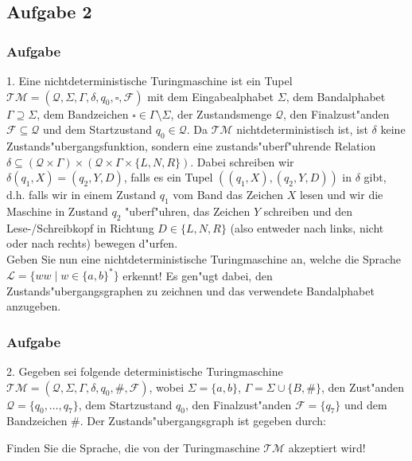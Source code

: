 \subsection{Aufgabe 2}
\begin{frame}
\frametitle{Aufgabe}
1. Eine nichtdeterministische Turingmaschine ist ein Tupel $\mathcal{TM} =
(\mathcal{Q},\Sigma,\Gamma,\delta,q_0,\square,\mathcal{F})$ mit dem
Eingabealphabet $\Sigma$, dem Bandalphabet $\Gamma \supseteq \Sigma$,
dem Bandzeichen $\square \in \Gamma \setminus \Sigma$, der Zustandsmenge
$\mathcal{Q}$, den Finalzust"anden $\mathcal{F} \subseteq \mathcal{Q}$ und
dem Startzustand $q_0 \in \mathcal{Q}$. Da $\mathcal{TM}$ nichtdeterministisch
ist, ist $\delta$ keine Zustands"ubergangsfunktion, sondern eine
zustands"uberf"uhrende Relation $\delta \subseteq (\mathcal{Q} \times \Gamma)
\times (\mathcal{Q} \times \Gamma \times \{L,N,R\})$. Dabei schreiben wir
$\delta(q_1,X) = (q_2,Y,D)$, falls es ein Tupel $((q_1,X),(q_2,Y,D))$ in $\delta$
gibt, d.h. falls wir in einem Zustand $q_1$ vom Band das Zeichen $X$ lesen und
wir die Maschine in Zustand $q_2$ "uberf"uhren, das Zeichen $Y$ schreiben und den
Lese-/Schreibkopf in Richtung $D \in \{L,N,R\}$ (also entweder nach links, nicht
oder nach rechts) bewegen d"urfen.\\[4pt]
Geben Sie nun eine nichtdeterministische Turingmaschine an, welche die Sprache
$\mathcal{L} = \{ww \; | \; w \in \{a,b\}^*\}$ erkennt! Es gen"ugt dabei, den
Zustands"ubergangsgraphen zu zeichnen und das verwendete Bandalphabet anzugeben.
\end{frame}
\begin{frame}
\frametitle{Aufgabe}
2. Gegeben sei folgende deterministische Turingmaschine $\mathcal{TM} =
(\mathcal{Q},\Sigma,\Gamma,\delta,q_0,\#,\mathcal{F})$, wobei $\Sigma = \{a,b\}$,
$\Gamma = \Sigma \cup \{B,\#\}$, den Zust"anden $\mathcal{Q} = \{q_0,\dots,q_7\}$,
dem Startzustand $q_0$, den Finalzust"anden $\mathcal{F} = \{q_7\}$ und dem
Bandzeichen $\#$. Der Zustands"ubergangsgraph ist gegeben durch:
\begin{center}
\resizebox{10cm}{!} {
}
\end{center}
Finden Sie die Sprache, die von der Turingmaschine $\mathcal{TM}$ akzeptiert wird!
\end{frame}


